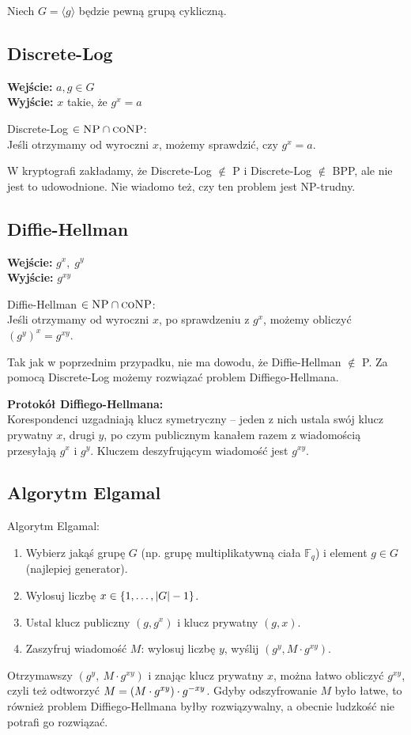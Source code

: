 Niech \( G = \langle g \rangle \) będzie pewną grupą cykliczną.

\subsection{Discrete-Log}
\textbf{Wejście:} \( a, g \in G \) \\
\textbf{Wyjście:} \( x \) takie, że \( g^x = a \)

Discrete-Log \( \in \textsc{NP} \cap \textsc{coNP}\): \\
Jeśli otrzymamy od wyroczni \( x \), możemy sprawdzić, czy \( g^x = a \).

W kryptografi zakładamy, że Discrete-Log \( \notin \) P i Discrete-Log \( \notin \) BPP, ale nie jest to udowodnione. Nie wiadomo też, czy ten problem jest NP-trudny.

\subsection{Diffie-Hellman}
\textbf{Wejście:} \( g^x,\; g^y \) \\
\textbf{Wyjście:} \( g^{xy} \)

Diffie-Hellman \( \in \textsc{NP} \cap \textsc{coNP} \): \\
Jeśli otrzymamy od wyroczni \( x \), po sprawdzeniu z \( g^x \), możemy obliczyć \( (g^{y})^x = g^{xy} \).

Tak jak w poprzednim przypadku, nie ma dowodu, że Diffie-Hellman \( \notin \) P. Za pomocą Discrete-Log możemy rozwiązać problem Diffiego-Hellmana.

\textbf{Protokół Diffiego-Hellmana:} \\
Korespondenci uzgadniają klucz symetryczny -- jeden z nich ustala swój klucz prywatny \( x \), drugi \( y \), po czym publicznym kanałem razem z wiadomością przesyłają \( g^x \) i \( g^y \). Kluczem deszyfrującym wiadomość jest \( g^{xy} \).

\subsection{Algorytm Elgamal}
\begin{greyframe}
	Algorytm Elgamal:
	\begin{enumerate}
		\item Wybierz jakąś grupę \( G \) (np. grupę multiplikatywną ciała \( \mathbb{F}_q \)) i element \( g \in G \) \\ (najlepiej generator).
		\item Wylosuj liczbę \( x \in \set{1, \ldots, \abs{G}-1} \).
		\item Ustal klucz publiczny \( (g,g^x) \) i klucz prywatny \( (g,x) \).
		\item Zaszyfruj wiadomość \( M \): wylosuj liczbę \( y \), wyślij \( (g^y, M \cdot g^{xy}) \).
	\end{enumerate}
\end{greyframe}
Otrzymawszy \( (g^y, \ M \cdot g^{xy}) \) i znając klucz prywatny \( x \), można łatwo obliczyć \( g^{xy} \), czyli też odtworzyć \( M = \left(M \cdot g^{xy}\right) \cdot g^{-xy} \).
Gdyby odszyfrowanie \( M \) było łatwe, to również problem Diffiego-Hellmana byłby rozwiązywalny, a obecnie ludzkość nie potrafi go rozwiązać.